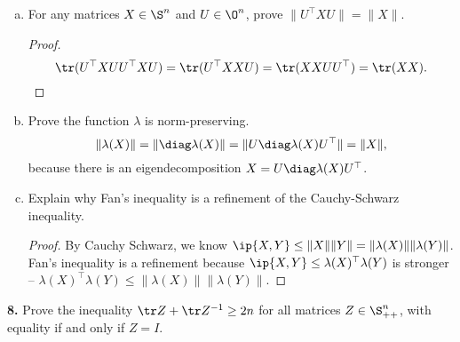 \documentclass[../borwein-lewis_notes.tex]{subfiles}
\begin{document}
\begin{enumerate}[(a)]
\item For any matrices $X\in\S^n$ and $U\in\O^n$, prove $\|U^\top X U\|
= \|X\|$.
\begin{proof}
\begin{equation*}
\tr(U^\top X U U^\top X U) = \tr (U^\top X X U) = \tr(XXUU^\top)=\tr(XX).
\end{equation*}
\end{proof}
\item Prove the function $\lambda$ is norm-preserving. 
\begin{equation*}
\|\lambda(X)\| = \|\diag\lambda(X)\| = \|U\diag\lambda(X)U^\top\|
= \|X\|,
\end{equation*}
because there is an eigendecomposition $X = U\diag\lambda(X)U^\top$.
\item Explain why Fan's inequality is a refinement of the Cauchy-Schwarz
inequality.
\begin{proof}
By Cauchy Schwarz, we know $\ip{X,Y} \leq \|X\|\|Y\| = \|\lambda(X)\|
\|\lambda(Y)\|$. Fan's inequality is a refinement because 
$\ip{X,Y}\leq \lambda(X)^\top\lambda(Y)$ is stronger -- 
$\lambda(X)^\top\lambda(Y)\leq\|\lambda(X)\|\|\lambda(Y)\|$.
\end{proof}
\end{enumerate}
\textbf{8.} Prove the inequality $\tr Z + \tr Z^{-1}\geq 2n$ for all 
matrices $Z\in\S_{++}^n$, with equality if and only if $Z=I$.
\end{document}
